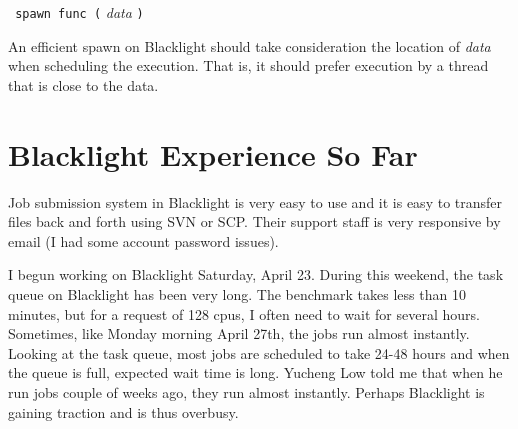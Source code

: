 \documentclass[12pt]{article}
\begin{document}
\texttt{ spawn func (} \textit{data} \texttt{)}

An efficient spawn on Blacklight should take consideration the location of \textit{data} when
scheduling the execution. That is, it should prefer execution by a thread that is close to the data.


\section{Blacklight Experience So Far}

Job submission system in Blacklight is very easy to use and it is easy to transfer files back and forth using SVN or SCP.
Their support staff is very responsive by email (I had some account password issues).

I begun working on Blacklight Saturday, April 23. During this weekend, the task queue on Blacklight has been very long. 
The benchmark takes less than 10 minutes, but for a request of 128 cpus, I often need to wait for several hours. Sometimes,
like Monday morning April 27th, the jobs run almost instantly. Looking at the task queue, most jobs are scheduled to take 24-48 hours and when the queue is full, expected wait time is long. Yucheng Low told me that when he run jobs couple of weeks ago, they run almost instantly. Perhaps Blacklight is gaining traction and is thus overbusy.

 
\end{document}
